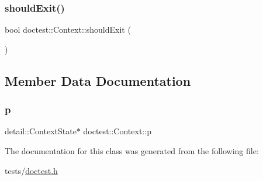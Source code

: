 \mbox{\label{classdoctest_1_1Context_a219b10301380b81c84c0824a6876d9aa}} 
\subsubsection{\texorpdfstring{should\+Exit()}{shouldExit()}}
{\footnotesize\ttfamily bool doctest\+::\+Context\+::should\+Exit (\begin{DoxyParamCaption}{ }\end{DoxyParamCaption})}



\subsection{Member Data Documentation}
\mbox{\label{classdoctest_1_1Context_a1e22f778caf173478623e22546d7b493}} 
\subsubsection{\texorpdfstring{p}{p}}
{\footnotesize\ttfamily detail\+::\+Context\+State$\ast$ doctest\+::\+Context\+::p\hspace{0.3cm}{\ttfamily [private]}}



The documentation for this class was generated from the following file\+:\begin{DoxyCompactItemize}
\item 
tests/\hyperlink{doctest_8h}{doctest.\+h}\end{DoxyCompactItemize}
